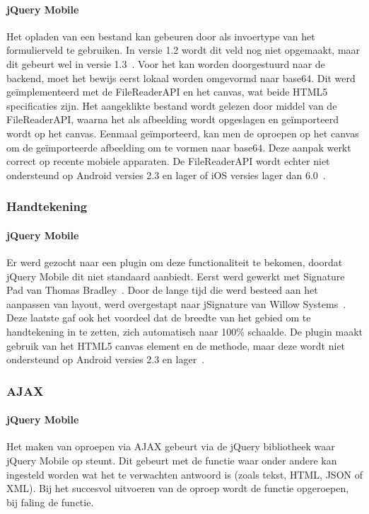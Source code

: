 \paragraph{jQuery Mobile} 
Het opladen van een bestand kan gebeuren door  als invoertype van het formulierveld te gebruiken. In versie 1.2 wordt dit veld nog niet opgemaakt, maar dit gebeurt wel in versie 1.3~\cite{JQuery2013d}. Voor het kan worden doorgestuurd naar de backend, moet het bewijs eerst lokaal worden omgevormd naar base64. Dit werd geïmplementeerd met de FileReaderAPI en het canvas, wat beide HTML5 specificaties zijn. Het aangeklikte bestand wordt gelezen door middel van de FileReaderAPI, waarna het als afbeelding wordt opgeslagen en geïmporteerd wordt op het canvas. Eenmaal geïmporteerd, kan men de  oproepen op het canvas om de geïmporteerde afbeelding om te vormen naar base64. Deze aanpak werkt correct op recente mobiele apparaten. De FileReaderAPI wordt echter niet ondersteund op Android versies 2.3 en lager of iOS versies lager dan 6.0~\cite{Deveria2013a}.

\subsubsection{Handtekening}

\paragraph{jQuery Mobile} 
Er werd gezocht naar een plugin om deze functionaliteit te bekomen, doordat jQuery Mobile dit niet standaard aanbiedt. Eerst werd gewerkt met Signature Pad van Thomas Bradley~\cite{Bradley2013}. Door de lange tijd die werd besteed aan het aanpassen van layout, werd overgestapt naar jSignature van Willow Systems~\cite{Systems2013}. Deze laatste gaf ook het voordeel dat de breedte van het gebied om te handtekening in te zetten, zich automatisch naar 100\% schaalde. De plugin maakt gebruik van het HTML5 canvas element en de  methode, maar deze wordt niet ondersteund op Android versies 2.3 en lager~\cite{Systems2013}.

\subsubsection{AJAX}

\paragraph{jQuery Mobile} 
Het maken van oproepen via AJAX gebeurt via de jQuery bibliotheek waar jQuery Mobile op steunt. Dit gebeurt met de functie  waar onder andere kan ingesteld worden wat het te verwachten antwoord is (zoals tekst, HTML, JSON of XML). Bij het succesvol uitvoeren van de oproep wordt de  functie opgeroepen, bij faling de  functie.

